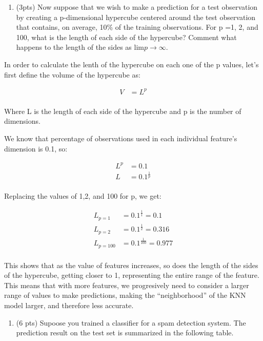 \documentclass[11pt]{article}
\providecommand{\tightlist}{%
      \setlength{\itemsep}{0pt}\setlength{\parskip}{0pt}}
\begin{document}
    \begin{enumerate}
\def\labelenumi{(\alph{enumi})}
\setcounter{enumi}{4}
\tightlist
\item
  (3pts) Now suppose that we wish to make a prediction for a test
  observation by creating a p-dimensional hypercube centered around the
  test observation that contains, on average, 10\% of the training
  observations. For p =1, 2, and 100, what is the length of each side of
  the hypercube? Comment what happens to the length of the sides as
  \(\text{lim} p \rightarrow \infty\).
\end{enumerate}

    In order to calculate the lenth of the hypercube on each one of the p
values, let's first define the volume of the hypercube as:

\[
\begin{align}
V &= L^{p} \\
\end{align}
\]

Where L is the length of each side of the hypercube and p is the number
of dimensions.

We know that percentage of observations used in each individual
feature's dimension is 0.1, so:

\[
\begin{align}
L^{p} &= 0.1 \\
L &= 0.1^{\frac{1}{p}} \\
\end{align}
\]

Replacing the values of 1,2, and 100 for p, we get:

\[
\begin{align}
L_{p=1} &= 0.1^{\frac{1}{1}} = 0.1 \\
L_{p=2} &= 0.1^{\frac{1}{2}} = 0.316 \\
L_{p=100} &= 0.1^{\frac{1}{100}} = 0.977 \\
\end{align}
\]

This shows that as the value of features increases, so does the length
of the sides of the hypercube, getting closer to 1, representing the
entire range of the feature. This means that with more features, we
progresively need to consider a larger range of values to make
predictions, making the ``neighborhood'' of the KNN model larger, and
therefore less accurate.

    \begin{enumerate}
\def\labelenumi{\arabic{enumi}.}
\setcounter{enumi}{3}
\tightlist
\item
  (6 pts) Supoose you trained a classifier for a spam detection system.
  The prediction result on the test set is summarized in the following
  table.
\end{enumerate}
\end{document}

